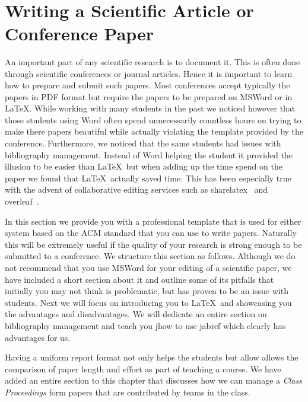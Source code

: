 
\FILENAME\

\section{Writing a Scientific Article or Conference Paper}
\label{S:writing}

An important part of any scientific research is to document it. This
is often done through scientific conferences or journal
articles. Hence it is important to learn how to prepare and submit
such papers. Most conferences accept typically the papers in PDF
format but require the papers to be prepared on MSWord or in
\LaTeX. While working with many students in the past we noticed
however that those students using Word often spend unnecessarily
countless hours on trying to make there papers beautiful while
actually violating the template provided by the
conference. Furthermore, we noticed that the same students had issues
with bibliography management. Instead of Word helping the student it
provided the illusion to be easier than \LaTeX~but when adding up the
time spend on the paper we found that \LaTeX~actually saved time. This
has been especially true with the advent of collaborative editing
services such as sharelatex~\cite{www-sharelatex} and
overleaf~\cite{www-overleaf}.

In this section we provide you with a professional template that is used
for either system based on the ACM standard that you can use to write
papers. Naturally this will be extremely useful if the quality of your
research is strong enough to be submitted to a conference. We structure
this section as follows. Although we do not recommend that you use
MSWord for your editing of a scientific paper, we have included a short
section about it and outline some of its pitfalls that initially you may
not think is problematic, but has proven to be an issue with students.
Next we will focus on introducing you to \LaTeX~and showcasing you the
advantages and disadvantages. We will dedicate an entire section on
bibliography management and teach you jhow to use jabref which clearly
has advantages for us.

Having a uniform report format not only helps the students but allow
allows the comparison of paper length and effort as part of teaching a
course. We have added an entire section to this chapter that discusses
how we can manage a \emph{Class Proceedings} form papers that are
contributed by teams in the class.

